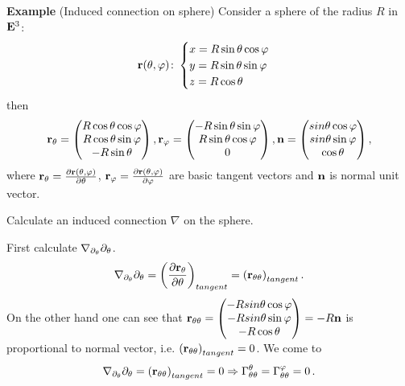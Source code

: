 \documentclass[12pt]{article}
\theoremstyle{theorem}
\numberwithin{equation}{section}
\begin{document}
  {\bf Example} (Induced connection on sphere)
   Consider a sphere of the radius $R$ in ${\bf E}^3$:
              $$
           {\bf r}(\theta,\varphi)\colon \begin{cases}
           x=R\sin\theta \cos\varphi\cr
           y=R\sin\theta \sin\varphi\cr
           z=R\cos\theta\cr
           \end{cases}
              $$
then
           $$
      {\bf r}_{\theta}=\begin{pmatrix}
            R\cos\theta\cos\varphi\cr
            R\cos\theta\sin\varphi\cr
            -R\sin\theta\cr
                  \end{pmatrix},
       {\bf r}_{\varphi}=\begin{pmatrix}
            -R\sin\theta\sin\varphi\cr
            R\sin\theta\cos\varphi\cr
            0\cr
                  \end{pmatrix},
                  {\bf n}=\begin{pmatrix}
            sin\theta\cos\varphi\cr
            sin\theta\sin\varphi\cr
            \cos\theta\cr
                  \end{pmatrix},
           $$
where ${\bf r}_\theta={\partial {\bf r}(\theta,\varphi)\over \partial \theta}$,
${\bf r}_\varphi={\partial {\bf r}(\theta,\varphi)\over \partial \varphi}$ are basic tangent vectors and ${\bf n}$ is normal unit vector.

Calculate an induced connection  $\nabla$ on the sphere.

First calculate $\nabla_{\partial_\theta}\partial_\theta$.
\begin{equation*}
    \nabla_{\partial_\theta}\partial_\theta=\left({\partial {\bf r}_\theta\over \partial\theta}\right)_{tangent}=
    \left({\bf r}_{\theta\theta}\right)_{tangent}.
\end{equation*}
On the other hand one can see that ${\bf r}_{\theta\theta}=\begin{pmatrix}
            -Rsin\theta\cos\varphi\cr
            -Rsin\theta\sin\varphi\cr
            -R\cos\theta\cr
                  \end{pmatrix}=-R{\bf n}$ is proportional to normal vector, i.e. $\left({\bf r}_{\theta\theta}\right)_{tangent}=0$.
                  We come to
\begin{equation}\label{inducedonsphere4}
    \nabla_{\partial_\theta}\partial_\theta=\left({\bf r}_{\theta\theta}\right)_{tangent}=0 \Rightarrow
    \Gamma^\theta_{\theta\theta}=\Gamma^\varphi_{\theta\theta}=0\,.
\end{equation}
\end{document}
